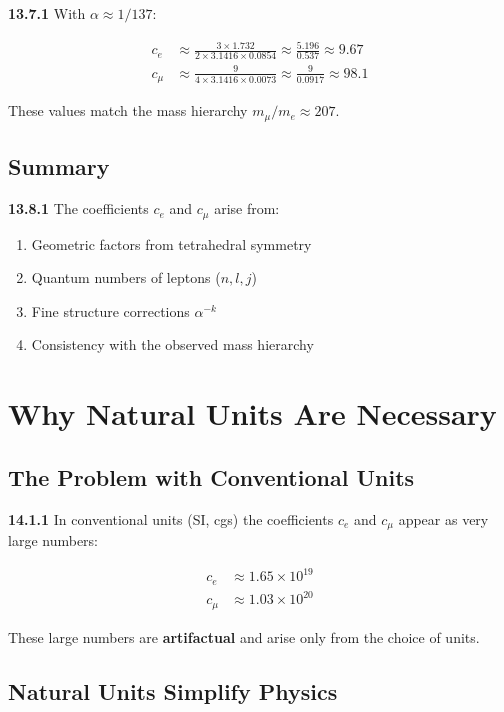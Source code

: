 \documentclass[12pt,a4paper]{article}
\begin{document}
\noindent \textbf{13.7.1} With $\alpha \approx 1/137$:

\begin{align*}
	c_e &\approx \frac{3 \times 1.732}{2 \times 3.1416 \times 0.0854} \approx \frac{5.196}{0.537} \approx 9.67 \\
	c_\mu &\approx \frac{9}{4 \times 3.1416 \times 0.0073} \approx \frac{9}{0.0917} \approx 98.1
\end{align*}

These values match the mass hierarchy $m_\mu/m_e \approx 207$.

\subsection{Summary}

\noindent \textbf{13.8.1} The coefficients $c_e$ and $c_\mu$ arise from:
\begin{enumerate}
	\item Geometric factors from tetrahedral symmetry
	\item Quantum numbers of leptons ($n,l,j$)
	\item Fine structure corrections $\alpha^{-k}$
	\item Consistency with the observed mass hierarchy
\end{enumerate}


\section{Why Natural Units Are Necessary}

\subsection{The Problem with Conventional Units}

\noindent \textbf{14.1.1} In conventional units (SI, cgs) the coefficients $c_e$ and $c_\mu$ appear as very large numbers:

\begin{align*}
	c_e &\approx 1.65 \times 10^{19} \\
	c_\mu &\approx 1.03 \times 10^{20}
\end{align*}

These large numbers are \textbf{artifactual} and arise only from the choice of units.

\subsection{Natural Units Simplify Physics}
\end{document}

